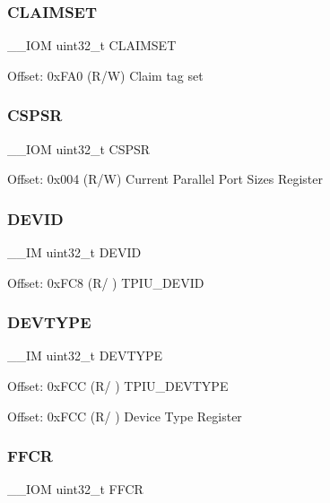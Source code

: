 \subsubsection{\texorpdfstring{CLAIMSET}{CLAIMSET}}
{\footnotesize\ttfamily \+\_\+\+\_\+\+I\+OM uint32\+\_\+t C\+L\+A\+I\+M\+S\+ET}

Offset\+: 0x\+F\+A0 (R/W) Claim tag set \mbox{\label{struct_t_p_i___type_abf4a378b17278d98d2a5f9315fce7a5e}} 
\subsubsection{\texorpdfstring{CSPSR}{CSPSR}}
{\footnotesize\ttfamily \+\_\+\+\_\+\+I\+OM uint32\+\_\+t C\+S\+P\+SR}

Offset\+: 0x004 (R/W) Current Parallel Port Sizes Register \mbox{\label{struct_t_p_i___type_aaed316dacef669454fa035e04ee90eca}} 
\subsubsection{\texorpdfstring{DEVID}{DEVID}}
{\footnotesize\ttfamily \+\_\+\+\_\+\+IM uint32\+\_\+t D\+E\+V\+ID}

Offset\+: 0x\+F\+C8 (R/ ) T\+P\+I\+U\+\_\+\+D\+E\+V\+ID \mbox{\label{struct_t_p_i___type_a81f643aff0e4bed2638a618e2b1fd3bb}} 
\subsubsection{\texorpdfstring{DEVTYPE}{DEVTYPE}}
{\footnotesize\ttfamily \+\_\+\+\_\+\+IM uint32\+\_\+t D\+E\+V\+T\+Y\+PE}

Offset\+: 0x\+F\+CC (R/ ) T\+P\+I\+U\+\_\+\+D\+E\+V\+T\+Y\+PE

Offset\+: 0x\+F\+CC (R/ ) Device Type Register \mbox{\label{struct_t_p_i___type_afe3ca1410c32188d26be24c4ee9e180c}} 
\subsubsection{\texorpdfstring{FFCR}{FFCR}}
{\footnotesize\ttfamily \+\_\+\+\_\+\+I\+OM uint32\+\_\+t F\+F\+CR}

